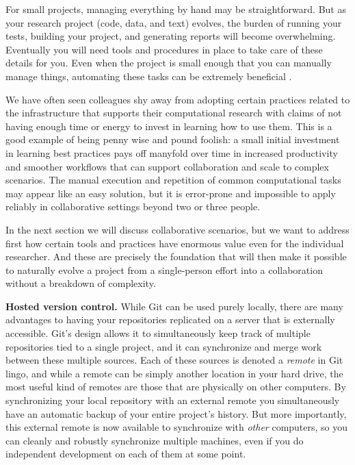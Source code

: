 \documentclass[11pt,oneside,english]{article}
\newcommand{\blockpar}[1]{\vspace*{3mm} \noindent \textbf{#1}}
\begin{document}
For small projects, managing everything by hand may be straightforward.
But as your research project (code, data, and text) evolves, the burden of
running your tests, building your project, and generating reports will become
overwhelming. Eventually you will need tools and procedures in place to take
care of these details for you. Even when the project is small enough that you
can manually manage things, automating these tasks can be extremely beneficial
\cite{doar2005practical}.

We have often seen colleagues shy away from adopting certain practices related
to the infrastructure that supports their computational research with claims of
not having enough time or energy to invest in learning how to use them.  This
is a good example of being penny wise and pound foolish: a small initial
investment in learning best practices pays off manyfold over time in increased
productivity and smoother workflows that can support collaboration and scale to
complex scenarios.  The manual execution and repetition of common computational
tasks may appear like an easy solution, but it is error-prone and impossible to
apply reliably in collaborative settings beyond two or three people.

In the next section we will discuss collaborative scenarios, but we want to
address first how certain tools and practices have enormous value even for the
individual researcher.  And these are precisely the foundation that will then
make it possible to naturally evolve a project from a single-person effort into
a collaboration without a breakdown of complexity.

\blockpar{Hosted version control.}  While Git can be used purely locally, there
are many advantages to having your repositories replicated on a server that is
externally accessible.  Git's design allows it to simultaneously keep track of
multiple repositories tied to a single project, and it can synchronize and
merge work between these multiple sources.  Each of these sources is denoted a
\emph{remote} in Git lingo, and while a remote can be simply another location
in your hard drive, the most useful kind of remotes are those that are
physically on other computers.  By synchronizing your local repository with an
external remote you simultaneously have an automatic backup of your entire
project's history.  But more importantly, this external remote is now available
to synchronize with \emph{other} computers, so you can cleanly and robustly
synchronize multiple machines, even if you do independent development on each of them
at some point.
\end{document}
